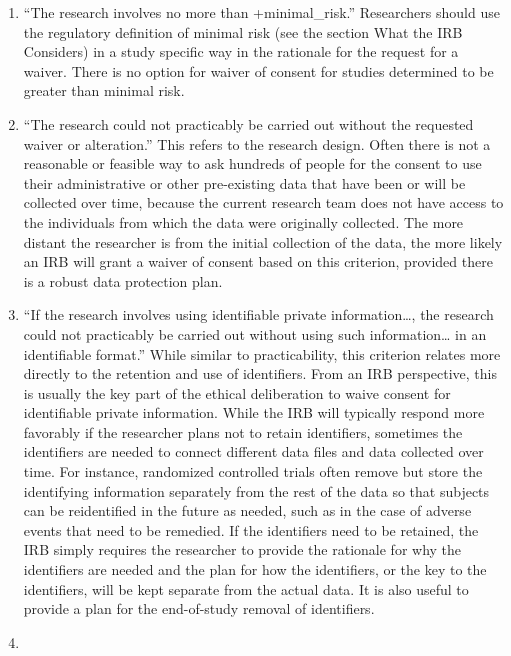 \documentclass[
]{WileySix}
\begin{document}
\begin{enumerate}
\def\labelenumi{\roman{enumi}.}
\item
  ``The research involves no more than +minimal\_risk\textbar.'' Researchers should use the regulatory definition of minimal risk (see the section What the IRB Considers) in a study specific way in the rationale for the request for a waiver. There is no option for waiver of consent for studies determined to be greater than minimal risk.
\item
  ``The research could not practicably be carried out without the requested waiver or alteration.'' This refers to the research design. Often there is not a reasonable or feasible way to ask hundreds of people for the consent to use their administrative or other pre-existing data that have been or will be collected over time, because the current research team does not have access to the individuals from which the data were originally collected. The more distant the researcher is from the initial collection of the data, the more likely an IRB will grant a waiver of consent based on this criterion, provided there is a robust data protection plan.
\item
  ``If the research involves using identifiable private information\ldots, the research could not practicably be carried out without using such information\ldots{} in an identifiable format.'' While similar to practicability, this criterion relates more directly to the retention and use of identifiers. From an IRB perspective, this is usually the key part of the ethical deliberation to waive consent for identifiable private information. While the IRB will typically respond more favorably if the researcher plans not to retain identifiers, sometimes the identifiers are needed to connect different data files and data collected over time. For instance, randomized controlled trials often remove but store the identifying information separately from the rest of the data so that subjects can be reidentified in the future as needed, such as in the case of adverse events that need to be remedied. If the identifiers need to be retained, the IRB simply requires the researcher to provide the rationale for why the identifiers are needed and the plan for how the identifiers, or the key to the identifiers, will be kept separate from the actual data. It is also useful to provide a plan for the end-of-study removal of identifiers.
\item

\end{enumerate}
\end{document}
